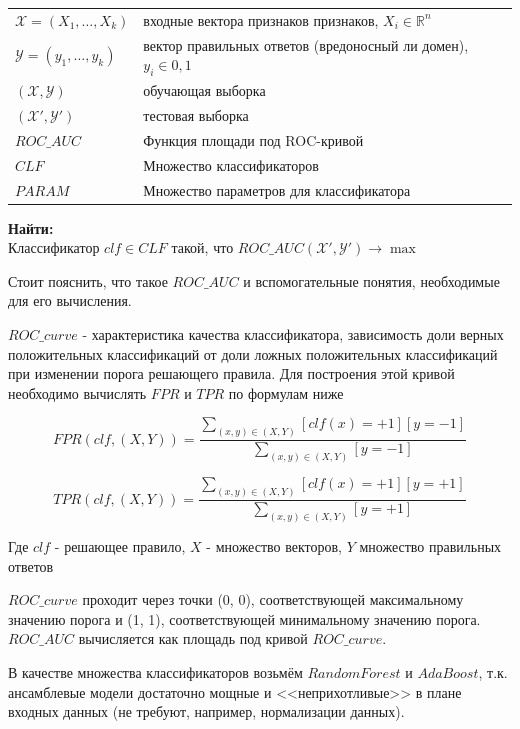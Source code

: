 \documentclass[14pt]{extreport}
\begin{document}
	\begin{tabular}{p{6cm} p{7.5cm}}
		 $\mathcal{X}=(X_1,\ldots,X_k)$ & входные вектора признаков признаков, $X_i\in\mathbb{R}^n$\\[0.1cm]
		 $\mathcal{Y}=(y_1,\ldots,y_k)$ & вектор правильных ответов (вредоносный ли домен), $y_i\in{0,1}$\\[0.1cm]
		 $(\mathcal{X},\mathcal{Y})$ & обучающая выборка  \\[0.1cm]
		 $(\mathcal{X'},\mathcal{Y'})$ & тестовая выборка  \\[0.1cm]
		 $ROC\_AUC$ & Функция площади под ROC-кривой \\[0.1cm]
		 $CLF$ & Множество классификаторов\\[0.1cm]
		 $PARAM$ & Множество параметров для классификатора\\[0.1cm]

	 \end{tabular}
	 
	 {\bf
    Найти:
	 } \\

	Классификатор $clf \in CLF$ такой, что $ROC\_AUC(\mathcal{X'},\mathcal{Y'}) \rightarrow \max$ 
	 \newline
	
	Стоит пояснить, что такое $ROC\_AUC$ и вспомогательные понятия, необходимые для его вычисления. 
	
	$ROC\_curve$ - характеристика качества классификатора, зависимость доли верных положительных классификаций от доли ложных положительных классификаций при изменении порога решающего правила. Для построения этой кривой необходимо вычислять $FPR$ и $TPR$ по формулам ниже
	
	$$FPR(clf, (X, Y)) = \frac{\sum_{(x, y) \in (X, Y)}[clf(x)=+1][y=-1]}{\sum_{(x, y) \in (X, Y)}[y=-1]}$$
	
	$$TPR(clf, (X, Y)) = \frac{\sum_{(x, y) \in (X, Y)}[clf(x)=+1][y=+1]}{\sum_{(x, y) \in (X, Y)}[y=+1]}$$
	
	Где $clf$ - решающее правило, $X$ - множество векторов, $Y$ множество правильных ответов
	
	$ROC\_curve$ проходит через точки (0, 0), соответствующей максимальному значению порога и (1, 1), соответствующей минимальному значению порога.
	$ROC\_AUC$ вычисляется как площадь под кривой $ROC\_curve$.
	
	В качестве множества классификаторов возьмём $RandomForest$ и $AdaBoost$, т.к. ансамблевые модели достаточно мощные и <<неприхотливые>> в плане входных данных (не требуют, например, нормализации данных).
	
\end{document}
